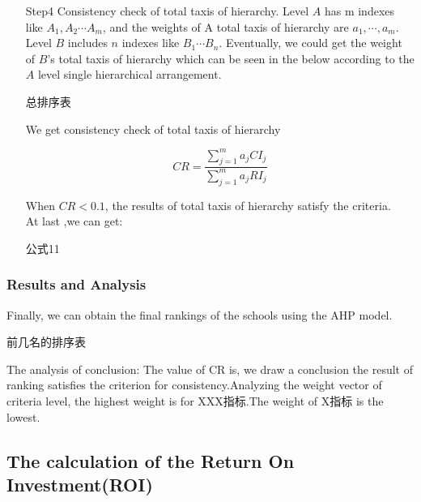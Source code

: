 \documentclass{mcmthesis}
\begin{document}
\begin{itemize}
    \item[Step4] Consistency check of total taxis of hierarchy.
    Level $A$ has m indexes like $A_1,A_2 \cdots A_m$, and the weights of A total taxis of hierarchy are $a_1, \cdots, a_m$. Level $B$ includes $n$ indexes like $B_1 \cdots B_n$.
    Eventually, we could get the weight of $B$'s total taxis of hierarchy which can be seen in the below according to the $A$ level single hierarchical arrangement.
    
    总排序表
    
    We get consistency check of total taxis of hierarchy
    
    \begin{equation}
    CR=\displaystyle\frac{\sum\limits_{j=1}^{m}a_jCI_j}{\sum\limits_{j=1}^{m}a_jRI_j}
    \end{equation}
    
    When $CR < 0.1$, the results of total taxis of hierarchy satisfy the criteria.\\
    At last ,we can get:
    
    公式11
    
\end{itemize}\par

\subsubsection{Results and Analysis}
Finally, we can obtain the final rankings of the schools using the AHP model.

前几名的排序表

The analysis of conclusion:
The value of CR is, we draw a conclusion the result of ranking satisfies the criterion for consistency.Analyzing the weight vector of criteria level, the highest weight is for XXX指标.The weight of X指标 is the lowest.

\subsection{The calculation of the Return On Investment(ROI)}
\end{document}
